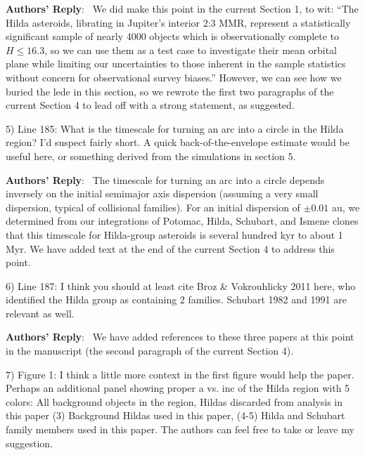 \documentclass[11pt]{article}
\newcounter{reviewer}
\newcounter{point}[reviewer]
\newenvironment{reply}
   {\medskip \noindent \begin{sf}\textbf{Authors' Reply}:\  }
   {\medskip \end{sf}\medskip}
\begin{document}
\begin{reply}
We did make this point in the current Section 1, to wit:
``The Hilda asteroids, librating in Jupiter’s interior 2:3 MMR, represent a statistically significant sample of nearly 4000 objects which is observationally complete to $H\leq16.3$, so we can use them as a test case to investigate their mean orbital plane while limiting our uncertainties to those inherent in the sample statistics without concern for observational survey biases.''
However, we can see how we buried the lede in this section, so we rewrote the first two paragraphs of the current Section 4 to lead off with a strong statement, as suggested.
\end{reply}

5) Line 185: What is the timescale for turning an arc into a circle in the Hilda region? I'd suspect fairly short. A quick back-of-the-envelope estimate would be useful here, or something derived from the simulations in section 5.

\begin{reply}
The timescale for turning an arc into a circle depends inversely on the initial semimajor axis dispersion (assuming a very small dispersion, typical of collisional families). For an initial dispersion of $\pm0.01$ au, we determined from our integrations of Potomac, Hilda, Schubart, and Ismene clones that this timescale for Hilda-group asteroids is several hundred kyr to about 1 Myr. We have added text at the end of the current Section 4 to address this point.
\end{reply}

6) Line 187: I think you should at least cite Broz \& Vokrouhlicky 2011 here, who identified the Hilda group as containing 2 families. Schubart 1982 and 1991 are relevant as well.

\begin{reply}
We have added references to these three papers at this point in the manuscript (the second paragraph of the current Section 4).
\end{reply}

7) Figure 1: I think a little more context in the first figure would help the paper. Perhaps an additional panel showing proper a vs. inc of the Hilda region with 5 colors: All background objects in the region, Hildas discarded from analysis in this paper (3) Background Hildas used in this paper, (4-5) Hilda and Schubart family members used in this paper. The authors can feel free to take or leave my suggestion.
\end{document}
